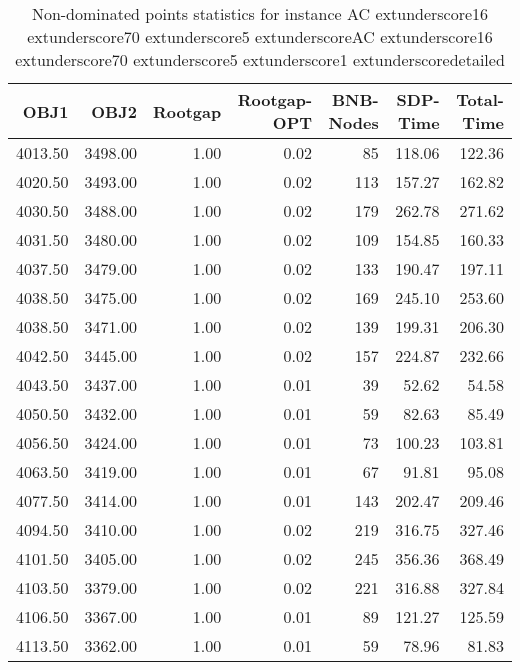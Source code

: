 \begin{table}
\caption{Non-dominated points statistics for instance AC	extunderscore16	extunderscore70	extunderscore5	extunderscoreAC	extunderscore16	extunderscore70	extunderscore5	extunderscore1	extunderscoredetailed}
\label{tab:stats/AC_16_70_5_AC_16_70_5_1_detailed}
\begin{tabular}{rrrrrrr}
\toprule
OBJ1 & OBJ2 & Rootgap & Rootgap-OPT & BNB-Nodes & SDP-Time & Total-Time \\
\midrule
4013.50 & 3498.00 & 1.00 & 0.02 & 85 & 118.06 & 122.36 \\
4020.50 & 3493.00 & 1.00 & 0.02 & 113 & 157.27 & 162.82 \\
4030.50 & 3488.00 & 1.00 & 0.02 & 179 & 262.78 & 271.62 \\
4031.50 & 3480.00 & 1.00 & 0.02 & 109 & 154.85 & 160.33 \\
4037.50 & 3479.00 & 1.00 & 0.02 & 133 & 190.47 & 197.11 \\
4038.50 & 3475.00 & 1.00 & 0.02 & 169 & 245.10 & 253.60 \\
4038.50 & 3471.00 & 1.00 & 0.02 & 139 & 199.31 & 206.30 \\
4042.50 & 3445.00 & 1.00 & 0.02 & 157 & 224.87 & 232.66 \\
4043.50 & 3437.00 & 1.00 & 0.01 & 39 & 52.62 & 54.58 \\
4050.50 & 3432.00 & 1.00 & 0.01 & 59 & 82.63 & 85.49 \\
4056.50 & 3424.00 & 1.00 & 0.01 & 73 & 100.23 & 103.81 \\
4063.50 & 3419.00 & 1.00 & 0.01 & 67 & 91.81 & 95.08 \\
4077.50 & 3414.00 & 1.00 & 0.01 & 143 & 202.47 & 209.46 \\
4094.50 & 3410.00 & 1.00 & 0.02 & 219 & 316.75 & 327.46 \\
4101.50 & 3405.00 & 1.00 & 0.02 & 245 & 356.36 & 368.49 \\
4103.50 & 3379.00 & 1.00 & 0.02 & 221 & 316.88 & 327.84 \\
4106.50 & 3367.00 & 1.00 & 0.01 & 89 & 121.27 & 125.59 \\
4113.50 & 3362.00 & 1.00 & 0.01 & 59 & 78.96 & 81.83 \\
\bottomrule
\end{tabular}
\end{table}
